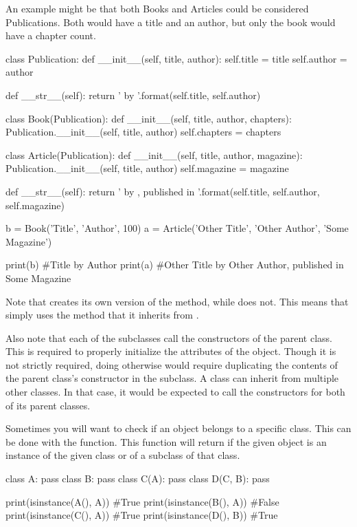 \documentclass[11pt]{cselabheader}
\begin{document}
An example
might be that both Books and Articles could be considered Publications. Both
would have a title and an author, but only the book would have a chapter count.

\begin{python3code}
class Publication:
    def __init__(self, title, author):
        self.title = title
        self.author = author

    def __str__(self):
        return '{} by {}'.format(self.title, self.author)

class Book(Publication):
    def __init__(self, title, author, chapters):
        Publication.__init__(self, title, author)
        self.chapters = chapters

class Article(Publication):
    def __init__(self, title, author, magazine):
        Publication.__init__(self, title, author)
        self.magazine = magazine

    def __str__(self):
        return '{} by {}, published in {}'.format(self.title, self.author,
            self.magazine)

b = Book('Title', 'Author', 100)
a = Article('Other Title', 'Other Author', 'Some Magazine')

print(b) #Title by Author
print(a) #Other Title by Other Author, published in Some Magazine
\end{python3code}

Note that  creates its own version of the
 method, while  does not. This means
that  simply uses the method that it inherits from
.

Also note that each of the subclasses call the constructors of the parent class.
This is required to properly initialize the attributes of the object. Though it
is not strictly required, doing otherwise would require duplicating the
contents of the parent class's constructor in the subclass. A class can inherit
from multiple other classes. In that case, it would be expected to call the
constructors for both of its parent classes.

Sometimes you will want to check if an object belongs to a specific class. This
can be done with the  function. This function will
return  if the given object is an instance of the given class
or of a subclass of that class.

\begin{python3code}
class A:
    pass
class B:
    pass
class C(A):
    pass
class D(C, B):
    pass

print(isinstance(A(), A)) #True
print(isinstance(B(), A)) #False
print(isinstance(C(), A)) #True
print(isinstance(D(), B)) #True
\end{python3code}
\end{document}
